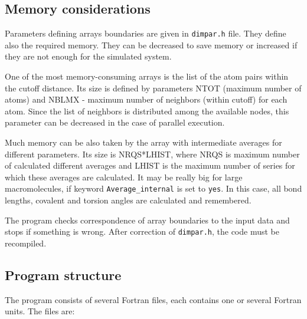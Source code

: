 \documentclass{article}
\begin{document}
\subsection{Memory considerations}

Parameters defining arrays boundaries are given in \verb|dimpar.h| file.
They define also the required memory.  They can be decreased to 
save memory or increased if they are not enough for the simulated system.

One of the most memory-consuming arrays is the list of the atom pairs
within the cutoff distance. Its size is defined by parameters NTOT (maximum 
number of atoms) and NBLMX - maximum number of neighbors (within cutoff) 
for each atom. Since the list of neighbors is distributed among the available 
nodes, this parameter can be decreased in the case of parallel execution. 

Much memory can be also taken by the array with intermediate averages for 
different parameters.  Its size is NRQS*LHIST, where NRQS is maximum number 
of calculated different averages and LHIST is the maximum number of series 
for which these averages are calculated. It may be really big 
for large macromolecules, if keyword \verb|Average_internal| is set to 
\verb|yes|. In this case, all bond lengths, covalent and torsion 
angles are calculated and remembered. 

The program checks correspondence of array boundaries to the input data and
stops if something is wrong. After correction of \verb|dimpar.h|, the code
must be recompiled.
                    

\subsection{Program structure}


The program consists of several Fortran files, each contains one
or several Fortran units. The files are:
\end{document}
